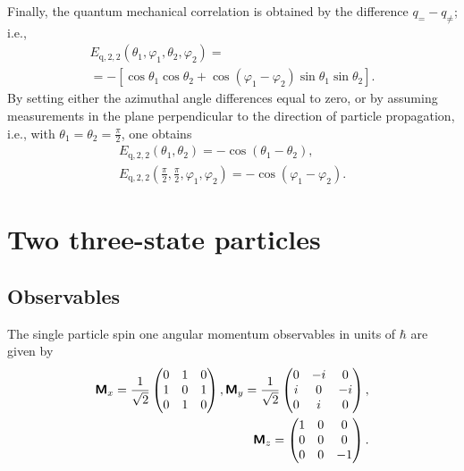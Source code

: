 \documentclass[%
  twocolumn,
 showpacs,
 showkeys,
 preprintnumbers,
 amsmath,amssymb,
 aps,
  pra,
  longbibliography,
 floatfix,
 ]{revtex4-1}
\begin{document}
Finally, the quantum mechanical correlation is obtained by  the difference $q_= -q_{\neq }$; i.e.,
\begin{equation}
\begin{split}
E_{\text{q},2,2}\left(\theta_1, \varphi_1 ,\theta_2,\varphi_2 \right)= \\
= -\left[\cos \theta_1 \cos \theta_2 + \cos (\varphi_1 - \varphi_2) \sin \theta_1 \sin \theta_2\right]
.
\end{split}
\label{2009-gtq-gme22}
\end{equation}
By setting either the azimuthal angle differences equal to zero,
or by assuming measurements in the plane perpendicular to the direction of particle propagation,
i.e., with $\theta_1=\theta_2 =\frac{\pi}{2}$,
one obtains
\begin{equation}
\label{2009-gtq-edosgc}
\begin{split}
E_{\text{q},2,2}(\theta_1,\theta_2)= -\cos (\theta_1 - \theta_2),\\
E_{\text{q},2,2}(\frac{\pi}{2},\frac{\pi}{2},\varphi_1 , \varphi_2) = - \cos (\varphi_1 - \varphi_2).
\end{split}
\end{equation}





\section{Two three-state particles}

\subsection{Observables}
The single particle  spin one angular momentum observables in units of $\hbar$ are given by~\cite{schiff-55}
\begin{equation}
\begin{split}
\textsf{\textbf{M}}_x=
\frac{1}{\sqrt{2}}
\begin{pmatrix}
0&1&0\\
1&0&1\\
0&1&0
\end{pmatrix}  ,
\textsf{\textbf{M}}_y=
\frac{1}{\sqrt{2}}
\begin{pmatrix}
0&-i&0\\
i&0&-i\\
0&i&0
\end{pmatrix}  ,
\\
\textsf{\textbf{M}}_z=
\begin{pmatrix}
1&0&0\\
0&0&0\\
0&0&-1
\end{pmatrix}
.
\end{split}
\end{equation}
\end{document}
